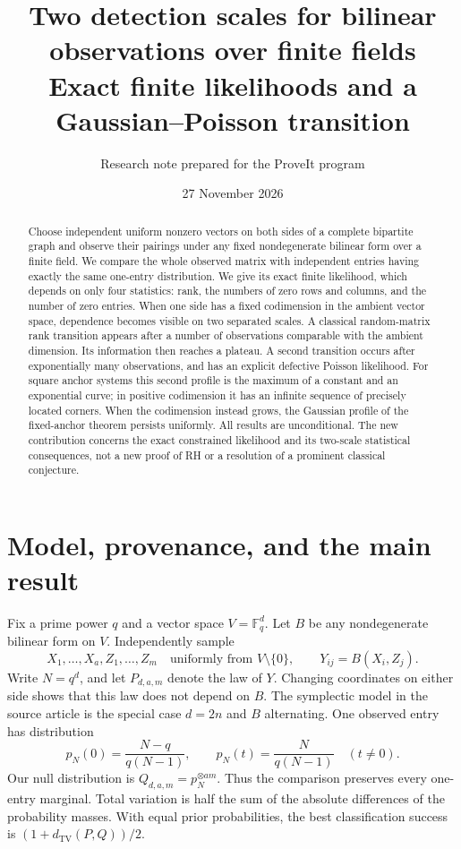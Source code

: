 \documentclass[11pt]{article}
\title{Two detection scales for bilinear observations over finite fields\\\large Exact finite likelihoods and a Gaussian--Poisson transition}
\author{Research note prepared for the ProveIt program}
\date{27 November 2026}
\theoremstyle{remark}\newtheorem{remark}[theorem]{Remark}
\newcommand{\F}{\mathbb F_q}
\newcommand{\TV}{d_{\mathrm{TV}}}
\begin{document}
\maketitle
\begin{abstract}
Choose independent uniform nonzero vectors on both sides of a complete bipartite graph and observe their pairings under any fixed nondegenerate bilinear form over a finite field. We compare the whole observed matrix with independent entries having exactly the same one-entry distribution. We give its exact finite likelihood, which depends on only four statistics: rank, the numbers of zero rows and columns, and the number of zero entries. When one side has a fixed codimension in the ambient vector space, dependence becomes visible on two separated scales. A classical random-matrix rank transition appears after a number of observations comparable with the ambient dimension. Its information then reaches a plateau. A second transition occurs after exponentially many observations, and has an explicit defective Poisson likelihood. For square anchor systems this second profile is the maximum of a constant and an exponential curve; in positive codimension it has an infinite sequence of precisely located corners. When the codimension instead grows, the Gaussian profile of the fixed-anchor theorem persists uniformly. All results are unconditional. The new contribution concerns the exact constrained likelihood and its two-scale statistical consequences, not a new proof of RH or a resolution of a prominent classical conjecture.
\end{abstract}
\tableofcontents

\section{Model, provenance, and the main result}
Fix a prime power $q$ and a vector space $V=\F^d$. Let $B$ be any nondegenerate bilinear form on $V$. Independently sample
\[
 X_1,\ldots,X_a,Z_1,\ldots,Z_m\quad\text{uniformly from }V\setminus\{0\},
 \qquad Y_{ij}=B(X_i,Z_j).
\]
Write $N=q^d$, and let $P_{d,a,m}$ denote the law of $Y$. Changing coordinates on either side shows that this law does not depend on $B$. The symplectic model in the source article is the special case $d=2n$ and $B$ alternating. One observed entry has distribution
\begin{equation}\label{eq:p}
 p_N(0)=\frac{N-q}{q(N-1)},\qquad p_N(t)=\frac{N}{q(N-1)}\quad(t\ne0).
\end{equation}
Our null distribution is $Q_{d,a,m}=p_N^{\otimes am}$. Thus the comparison preserves every one-entry marginal. Total variation is half the sum of the absolute differences of the probability masses. With equal prior probabilities, the best classification success is $(1+\TV(P,Q))/2$.
\end{document}
